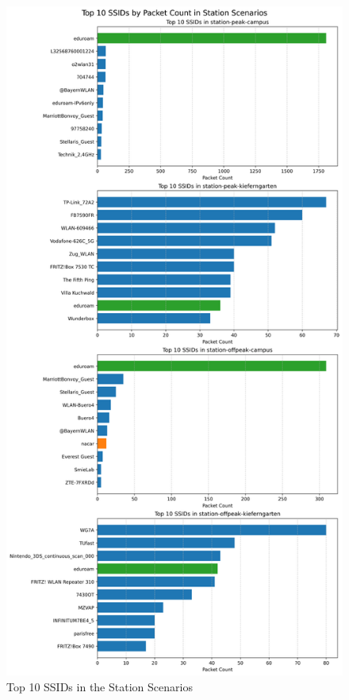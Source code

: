 \documentclass[sigconf,nonacm]{acmart}
\begin{document}
\begin{figure}
    \centering
    \includegraphics[width=\columnwidth]{images/part1/ssid/top-ssids-station-scenarios.png}
    \caption{Top 10 SSIDs in the Station Scenarios}
    \label{tab:station_ssids}
\end{figure}
\end{document}
